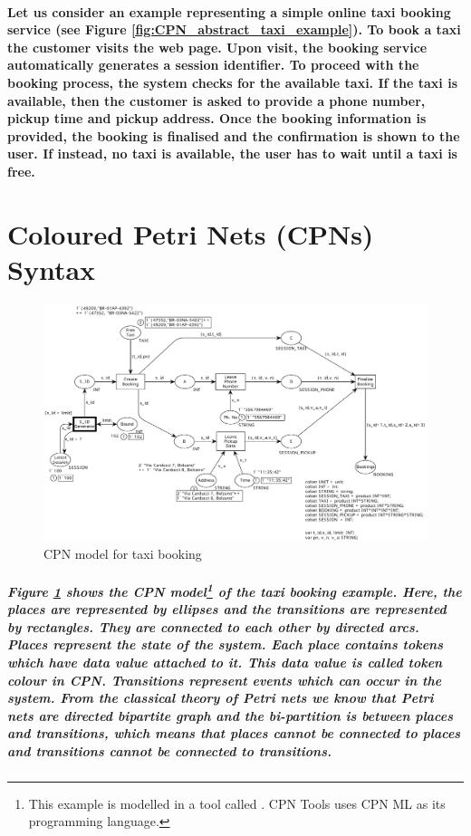 \paragraph{\textnormal{Let us consider an example representing a simple online taxi booking service (see Figure \ref{fig:CPN_abstract_taxi_example}). To book a taxi the customer visits the web page. Upon visit, the booking service automatically generates a session identifier. To proceed with the booking process, the system checks for the available taxi. If the taxi is available, then the customer is asked to provide a phone number, pickup time and pickup address. Once the booking information is provided, the booking is finalised and the confirmation is shown to the user. If instead, no taxi is available, the user has to wait until a taxi is free.}}

\section{Coloured Petri Nets (CPNs) Syntax} \label{sec:CPN_Syntax}

\begin{figure}[!htbp]
	\centering
	\includegraphics[scale = 0.35]{CPN_Taxi_Booking.pdf}
	\caption{CPN model for taxi booking}
	\label{fig:CPN_Taxi_Booking}
\end{figure}

\subparagraph*{\textnormal{Figure \ref{fig:CPN_Taxi_Booking} shows the CPN model\footnote{This example is modelled in a tool called \cite{CPN_Tools}. CPN Tools uses CPN ML as its programming language.} of the taxi booking example. Here, the places are represented by ellipses and the transitions are represented by rectangles. They are connected to each other by directed arcs. Places represent the state of the system. Each place contains tokens which have data value attached to it. This data value is called \textit{token colour} in CPN. Transitions represent events which can occur in the system. From the classical theory of Petri nets\cite{DBLP:books/daglib/Reisig2013} we know that Petri nets are directed bipartite graph and the bi-partition is between places and transitions, which means that places cannot be connected to places and transitions cannot be connected to transitions.}}

